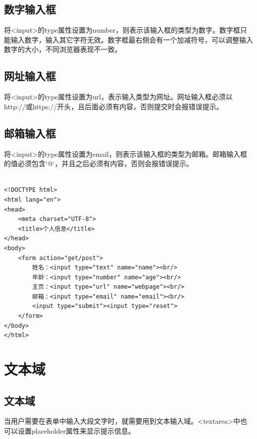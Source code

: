 \subsection{数字输入框}

将<input>的type属性设置为number，则表示该输入框的类型为数字。数字框只能输入数字，输入其它字符无效。数字框最右侧会有一个加减符号，可以调整输入数字的大小，不同浏览器表现不一致。

\subsection{网址输入框}

将<input>的type属性设置为url，表示输入类型为网址。网址输入框必须以http://或https://开头，且后面必须有内容，否则提交时会报错误提示。

\subsection{邮箱输入框}

将<input>的type属性设置为email，则表示该输入框的类型为邮箱。邮箱输入框的值必须包含`@`，并且之后必须有内容，否则会报错误提示。 \\

 \\

\begin{lstlisting}[style=htmlcssjs]
<!DOCTYPE html>
<html lang="en">
<head>
    <meta charset="UTF-8">
    <title>个人信息</title>
</head>
<body>
    <form action="get/post">
        姓名：<input type="text" name="name"><br/>
        年龄：<input type="number" name="age"><br/>
        主页：<input type="url" name="webpage"><br/>
        邮箱：<input type="email" name="email"><br/>
        <input type="submit"><input type="reset">
    </form>
</body>
</html>
\end{lstlisting}

\newpage

\section{文本域}

\subsection{文本域}

当用户需要在表单中输入大段文字时，就需要用到文本输入域。<textarea>中也可以设置placeholder属性来显示提示信息。 \\

